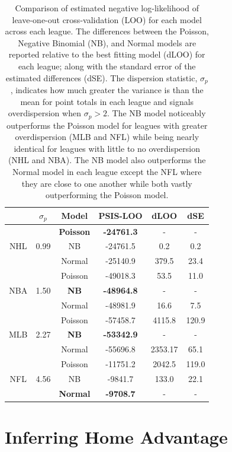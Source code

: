 \begin{table}
\centering
\begin{tabular}{c@{\hskip0.35in}c@{\hskip0.35in}c@{\hskip 0.25in}c@{\hskip 0.25in}c@{\hskip 0.15in}c}
\toprule
& \boldmath$\sigma_p$ & \textbf{Model} & \textbf{PSIS-LOO} & \textbf{dLOO} & \textbf{dSE}\\
\midrule
&& \textbf{Poisson} & \textbf{-24761.3} & - & -\\
NHL & 0.99 & NB & -24761.5 & 0.2 & 0.2\\
&& Normal & -25140.9 & 379.5 & 23.4\\
\midrule
&& Poisson & -49018.3 & 53.5 & 11.0\\
NBA & 1.50 & \textbf{NB} & \textbf{-48964.8} & - & -\\
&& Normal & -48981.9 & 16.6 & 7.5\\
\midrule
&& Poisson & -57458.7 & 4115.8 & 120.9\\
MLB & 2.27 & \textbf{NB} & \textbf{-53342.9} & - & -\\
&& Normal & -55696.8 & 2353.17 & 65.1\\
\midrule
&& Poisson & -11751.2 & 2042.5 & 119.0\\
NFL & 4.56 & NB & -9841.7 & 133.0 & 22.1\\
&& \textbf{Normal} & \textbf{-9708.7} & - & -\\
\bottomrule
\end{tabular}
\caption{Comparison of estimated negative log-likelihood of leave-one-out cross-validation (LOO) for each model across each league. The differences between the Poisson, Negative Binomial (NB), and Normal models are reported relative to the best fitting model (dLOO) for each league; along with the standard error of the estimated differences (dSE). The dispersion statistic, \(\sigma_p\), indicates how much greater the variance is than the mean for point totals in each league and signals overdispersion when \(\sigma_p > 2\). The NB model noticeably outperforms the Poisson model for leagues with greater overdispersion (MLB and NFL) while being nearly identical for leagues with little to no overdispersion (NHL and NBA). The NB model also outperforms the Normal model in each league except the NFL where they are close to one another while both vastly outperforming the Poisson model.}\label{tab:loo}
\end{table}

\section{Inferring Home Advantage} \label{results_3}

